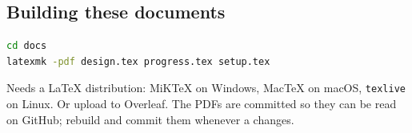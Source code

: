 \documentclass[11pt]{article}
\begin{document}
\subsection{Building these documents}
\begin{lstlisting}[language=bash]
cd docs
latexmk -pdf design.tex progress.tex setup.tex
\end{lstlisting}
Needs a LaTeX distribution: MiKTeX on Windows, MacTeX on macOS, \texttt{texlive}
on Linux. Or upload  to Overleaf. The PDFs are committed so they can
be read on GitHub; rebuild and commit them whenever a  changes.
\end{document}
